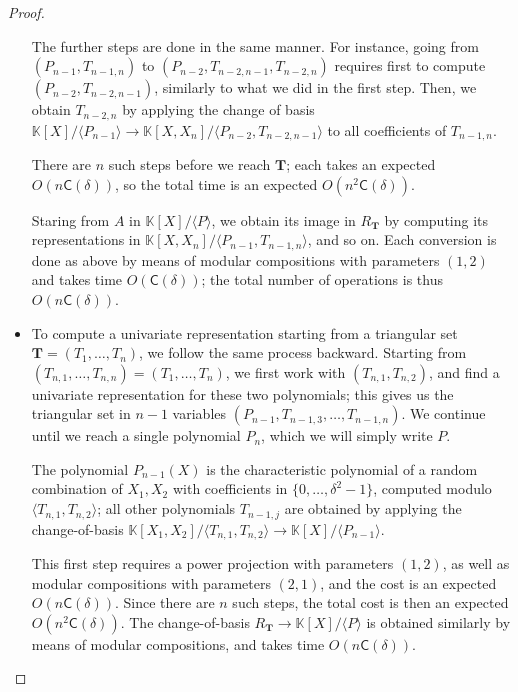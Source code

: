\documentclass[12pt]{article}
\def\CC {\ensuremath{\mathsf{C}}}
\def\K {\ensuremath{\mathbb{K}}}
\def\Tt {\ensuremath{\mathbf{T}}}
\begin{document}
\begin{proof}
\begin{itemize}
    The further steps are done in the same manner. For instance, going
    from $(P_{n-1},T_{n-1,n})$ to $(P_{n-2},T_{n-2,n-1},T_{n-2,n})$
    requires first to compute $(P_{n-2},T_{n-2,n-1})$, similarly to
    what we did in the first step. Then, we obtain $T_{n-2,n}$ by
    applying the change of basis $\K[X]/\langle P_{n-1}\rangle \to
    \K[X,X_n]/\langle P_{n-2},T_{n-2,n-1}\rangle$ to all coefficients
    of $T_{n-1,n}$.

    There are $n$ such steps before we reach $\Tt$; each takes an
    expected $O(n\CC(\delta))$, so the total time is an expected
    $O(n^2\CC(\delta))$.

    Staring from $A$ in $\K[X]/\langle P\rangle$, we obtain its image
    in $R_\Tt$ by computing its representations in $\K[X,X_n]/\langle
    P_{n-1},T_{n-1,n}\rangle$, and so on. Each conversion is done as
    above by means of modular compositions with parameters $(1,2)$ and
    takes time $O(\CC(\delta))$; the total number of operations is thus
    $O(n\CC(\delta))$.

  \item To compute a univariate representation starting from a
    triangular set $\Tt=(T_1,\dots,T_n)$, we follow the same process
    backward. Starting from $(T_{n,1},\dots,T_{n,n})=(T_1,\dots,T_n)$,
    we first work with $(T_{n,1},T_{n,2})$, and find a univariate
    representation for these two polynomials; this gives us the
    triangular set in $n-1$ variables
    $(P_{n-1},T_{n-1,3},\dots,T_{n-1,n})$. We continue until we reach
    a single polynomial $P_n$, which we will simply write $P$.

    The polynomial $P_{n-1}(X)$ is the characteristic polynomial of a
    random combination of $X_1,X_2$ with coefficients in
    $\{0,\dots,\delta^2-1\}$, computed modulo $\langle
    T_{n,1},T_{n,2}\rangle$; all other polynomials $T_{n-1,j}$ are
    obtained by applying the change-of-basis $\K[X_1,X_2]/\langle
    T_{n,1},T_{n,2}\rangle \to \K[X]/\langle P_{n-1}\rangle$.

    This first step requires a power projection with parameters
    $(1,2)$, as well as modular compositions with parameters $(2,1)$,
    and the cost is an expected $O(n\CC(\delta))$. Since there are $n$
    such steps, the total cost is then an expected
    $O(n^2\CC(\delta))$. The change-of-basis $R_\Tt \to \K[X]/\langle
    P \rangle$ is obtained similarly by means of modular compositions,
    and takes time $O(n\CC(\delta))$.
  \end{itemize}
\end{proof}
\end{document}
